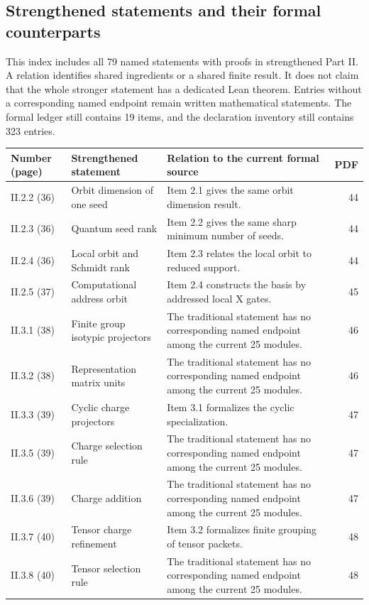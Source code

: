 \subsection{Strengthened statements and their formal counterparts}
This index includes all 79 named statements with proofs in strengthened Part II. A relation identifies shared ingredients or a shared finite result. It does not claim that the whole stronger statement has a dedicated Lean theorem. Entries without a corresponding named endpoint remain written mathematical statements. The formal ledger still contains 19 items, and the declaration inventory still contains 323 entries.

{\small\begin{longtable}{@{}p{.13\linewidth}p{.31\linewidth}p{.42\linewidth}r@{}}\toprule Number (page) & Strengthened statement & Relation to the current formal source & PDF\\\midrule\endhead
II.2.2 (36) & Orbit dimension of one seed & Item 2.1 gives the same orbit dimension result. & 44\\
II.2.3 (36) & Quantum seed rank & Item 2.2 gives the same sharp minimum number of seeds. & 44\\
II.2.4 (36) & Local orbit and Schmidt rank & Item 2.3 relates the local orbit to reduced support. & 44\\
II.2.5 (37) & Computational address orbit & Item 2.4 constructs the basis by addressed local X gates. & 45\\
II.3.1 (38) & Finite group isotypic projectors & The traditional statement has no corresponding named endpoint among the current 25 modules. & 46\\
II.3.2 (38) & Representation matrix units & The traditional statement has no corresponding named endpoint among the current 25 modules. & 46\\
II.3.3 (39) & Cyclic charge projectors & Item 3.1 formalizes the cyclic specialization. & 47\\
II.3.5 (39) & Charge selection rule & The traditional statement has no corresponding named endpoint among the current 25 modules. & 47\\
II.3.6 (39) & Charge addition & The traditional statement has no corresponding named endpoint among the current 25 modules. & 47\\
II.3.7 (40) & Tensor charge refinement & Item 3.2 formalizes finite grouping of tensor packets. & 48\\
II.3.8 (40) & Tensor selection rule & The traditional statement has no corresponding named endpoint among the current 25 modules. & 48\\

\end{longtable}}
